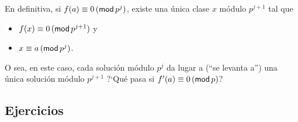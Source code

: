 En definitiva, si $f(a)\equiv 0\tmodulo[p^j]$,
existe una \'unica clase $x$ m\'odulo $p^{j+1}$
tal que
\begin{itemize}
	\item $f(x)\equiv 0\tmodulo[p^{j+1}]$ y
	\item $x\equiv a\tmodulo[p^j]$.
\end{itemize}
%
O sea, en este caso, cada soluci\'on m\'odulo $p^j$
da lugar a (``se levanta a'') una \'unica soluci\'on
m\'odulo $p^{j+1}$
?`Qu\'e pasa si $f'(a)\equiv 0\tmodulo[p]$?

\subsection*{Ejercicios}


